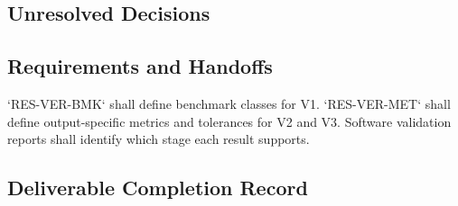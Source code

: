 \subsection{Unresolved Decisions}
\label{sec:res-ver-frm-unresolved-decisions}


\subsection{Requirements and Handoffs}
\label{sec:res-ver-frm-requirements}


`RES-VER-BMK` shall define benchmark classes for V1. `RES-VER-MET`
shall define output-specific metrics and tolerances for V2 and V3.
Software validation reports shall identify which stage each result
supports.

\subsection{Deliverable Completion Record}
\label{sec:res-ver-frm-completion-record}

%
%
%
